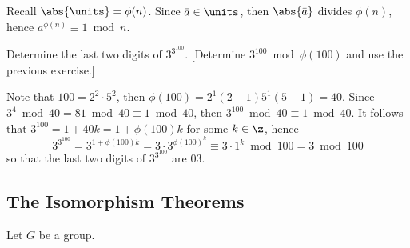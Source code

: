 \begin{problems}
    \begin{sol}
        Recall $\abs{\units} = \phi(n)$. Since $\bar a \in \units$, then $\abs{\bar a}$ divides $\phi(n)$, hence $a^{\phi(n)} \equiv 1 \bmod n$.
    \end{sol}
    \item Determine the last two digits of $3^{3^{100}}$. [Determine $3^{100} \bmod \phi(100)$ and use the previous exercise.]
    \begin{sol}
        Note that $100 = 2^2 \cdot 5^2$, then $\phi(100) = 2^1(2 - 1)5^1(5 - 1) = 40$. Since $3^4 \bmod 40 = 81 \bmod 40 \equiv 1 \bmod 40$, then $3^{100} \bmod 40 \equiv 1 \bmod 40$. It follows that $3^{100} = 1 + 40k = 1 + \phi(100)k$ for some $k \in \z$, hence
        \[3^{3^{100}} = 3^{1 + \phi(100)k} = 3 \cdot 3^{{\phi(100)}^k} \equiv 3 \cdot 1^k \bmod 100 = 3 \bmod 100\]
        so that the last two digits of $3^{3^{100}}$ are 03.
    \end{sol}
\end{problems}

\newpage

\subsection{The Isomorphism Theorems}

Let $G$ be a group.

